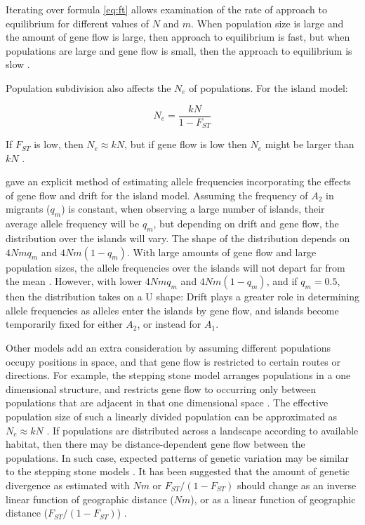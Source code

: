Iterating over formula \ref{eq:ft} allows examination of the rate of approach to equilibrium for different values of $N$ and $m$.
When population size is large and the amount of gene flow is large, then approach to equilibrium is fast, but when populations are large and gene flow is small, then the approach to equilibrium is slow \parencite{Hedrick2010}.

Population subdivision also affects the $N_e$ of populations.
For the island model:

\begin{equation}
N_e=\frac{kN}{1-F_{ST}}
\end{equation}

If $F_{ST}$ is low, then $N_e\approx kN$, but if gene flow is low then $N_e$ might be larger than $kN$ \parencite{Wright1943}.

\cite{Wright1940} gave an explicit method of estimating allele frequencies incorporating the effects of gene flow and drift for the island model.
Assuming the frequency of $A_2$ in migrants ($q_m$) is constant, when observing a large number of islands, their average allele frequency will be $q_m$, but depending on drift and gene flow, the distribution over the islands will vary.
The shape of the distribution depends on $4Nmq_m$ and $4Nm(1-q_m)$.
With large amounts of gene flow and large population sizes, the allele frequencies over the islands will not depart far from the mean \parencite{Hedrick2010}.
However, with lower $4Nmq_m$ and $4Nm(1-q_m)$, and if $q_m = 0.5$, then the distribution takes on a U shape: Drift plays a greater role in determining allele frequencies as alleles enter the islands by gene flow, and islands become temporarily fixed for either $A_2$, or instead for $A_1$.

Other models add an extra consideration by assuming different populations occupy positions in space, and that gene flow is restricted to certain routes or directions.
For example, the stepping stone model arranges populations in a one dimensional structure, and restricts gene flow to occurring only between populations that are adjacent in that one dimensional space \parencite{Hedrick2010}.
The effective population size of such a linearly divided population can be approximated as $N_e\approx kN$ \parencite{Maruyama1970}.
If populations are distributed across a landscape according to available habitat, then there may be distance-dependent gene flow between the populations.
In such case, expected patterns of genetic variation may be similar to the stepping stone models \parencite{Wright1943}.
It has been suggested that the amount of genetic divergence as estimated with $Nm$ or $F_{ST}/(1-F_{ST})$ should change as an inverse linear function of geographic distance ($Nm$), or as a linear function of geographic distance ($F_{ST}/(1-F_{ST})$) \parencite{Rousset1997}.

